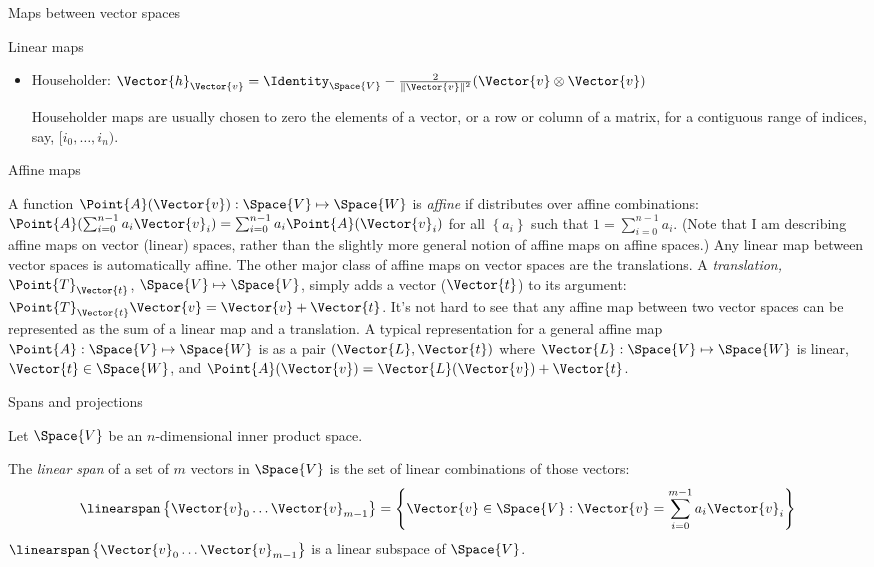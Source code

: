 \begin{plSection}{Maps between vector spaces}
\begin{plSection}{Linear maps}
\begin{itemize}
\item Householder:
$\Vector{h}_{\Vector{v}} = \Identity_{\Space{V}} - \frac{2}{\| \Vector{v} \|^2} (\Vector{v} \otimes \Vector{v})$

Householder maps are usually chosen to zero the elements of
a vector, or a row or column of a matrix, for a contiguous range of
indices, say, $[i_0,\ldots,i_n)$.

\end {itemize}

\end{plSection}%
\begin{plSection}{Affine maps}
\label{sec:affine-maps}

A function $\Point{A}(\Vector{v}):\Space{V} \mapsto \Space{W}$
is {\it affine} if distributes over affine combinations:
$\Point{A}(\sum_{i=0}^{n-1} a_i \Vector{v}_i) = \sum_{i=0}^{n-1} a_i \Point{A}(\Vector{v}_i) $
for all $\left\{a_i\right\}$ such that $1 = \sum_{i=0}^{n-1} a_i$.
(Note that I am describing affine maps on vector (linear) spaces,
rather than the slightly more general notion of affine maps on affine spaces.)
Any linear map between vector spaces is automatically affine.
The other major class of affine maps on vector spaces are the translations.
A {\it translation,} 
$\Point{T}_{\Vector{t}}$, $\Space{V} \mapsto \Space{V}$,
simply adds a vector ($\Vector{t}$) to its argument:
$\Point{T}_{\Vector{t}} \Vector{v} = \Vector{v} + \Vector{t}$.
It's not hard to see that any affine map between two vector spaces
can be represented as the sum of a linear map and a translation.
A typical representation for a general affine map 
$\Point{A} : \Space{V} \mapsto \Space{W}$
is as a pair $(\Vector{L},\Vector{t})$ where 
$\Vector{L} : \Space{V} \mapsto \Space{W}$ is linear,
$\Vector{t} \in \Space{W}$, and $\Point{A}(\Vector{v}) = 
\Vector{L}(\Vector{v}) + \Vector{t}$.

\end{plSection}%
\begin{plSection}{Spans and projections}
\label{sec:spans-and-projections}

Let $\Space{V}$ be an $n$-dimensional inner product space.

The {\it linear span} of a set of $m$ vectors in $\Space{V}$
is the set of linear combinations of those vectors:
\begin{equation}
\linearspan\left\{ \Vector{v}_0 \ldots \Vector{v}_{m-1} \right\} 
= \left\{\Vector{v} \in \Space{V} : \Vector{v} = \sum_{i=0}^{m-1} a_i \Vector{v}_i\right\}
\end{equation}
$\linearspan\left\{ \Vector{v}_0 \ldots \Vector{v}_{m-1} \right\}$ 
is a linear subspace of $\Space{V}$.


\end{plSection}
\end{plSection}
